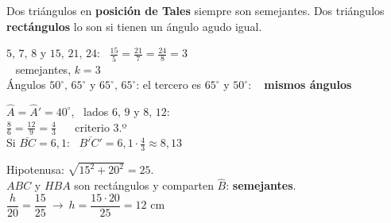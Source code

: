 \documentclass[11pt,a4paper]{article}
\newcommand{\heavy}{\fontseries{eb}\selectfont}
\newcommand{\be}[1]{{\color{fmok}\faCheckCircle}\ \ensuremath{#1}}
\begin{document}
\vfill
{\large Dos triángulos en \textbf{posición de Tales} siempre son semejantes. Dos triángulos \textbf{rectángulos} lo son si tienen un ángulo agudo igual.}

\vfill
\begin{exemple}[Ejemplos]
\begin{minipage}[t]{0.48\linewidth}
$5,\,7,\,8$ y $15,\,21,\,24$: \ $\frac{15}{5}=\frac{21}{7}=\frac{24}{8}=3$\\ \be{} semejantes, $\boxed{k=3}$\\[5pt]
Ángulos $50^\circ,\,65^\circ$ y $65^\circ,\,65^\circ$: el tercero es $65^\circ$ y $50^\circ$: \be{} \textbf{mismos ángulos}
\end{minipage}\hfill
\begin{minipage}[t]{0.49\linewidth}
$\hat A=\hat A'=40^\circ$, \ lados $6,\,9$ y $8,\,12$:\\
$\frac86=\frac{12}{9}=\frac43$ \ \be{} criterio 3.º\\[3pt]
Si $\overline{BC}=6{,}1$: \ $\overline{B'C'}=6{,}1\cdot\frac43\approx\boxed{8{,}13}$
\end{minipage}
\end{exemple}

\vfill
\begin{exemple}
\begin{minipage}[c]{0.6\linewidth}
Hipotenusa: $\sqrt{15^2+20^2}=25$.\\[3pt]
$ABC$ y $HBA$ son rectángulos y comparten $\hat B$: \textbf{semejantes}.\\[3pt]
$\dfrac{h}{20}=\dfrac{15}{25}\ \to\ h=\dfrac{15\cdot20}{25}=\boxed{12\text{ cm}}$
\end{minipage}\hfill
\begin{minipage}[c]{0.36\linewidth}\centering
{}
\end{minipage}
\end{exemple}
\end{document}
